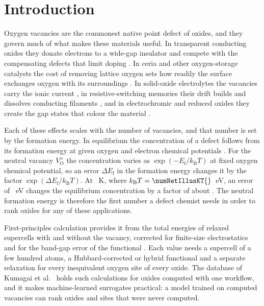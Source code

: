\section{Introduction}
\label{sec:introduction}

Oxygen vacancies are the commonest native point defect of oxides, and they govern much of what makes these materials useful. In transparent conducting oxides they donate electrons to a wide-gap insulator and compete with the compensating defects that limit doping \citep{Lany2007dopability,Zhang2001intrinsic,Ellmer2012past}. In ceria and other oxygen-storage catalysts the cost of removing lattice oxygen sets how readily the surface exchanges oxygen with its surroundings \citep{Esch2005electron,Paier2013oxygen}. In solid-oxide electrolytes the vacancies carry the ionic current \citep{Goodenough2003oxideion,Kilner2014materials}, in resistive-switching memories their drift builds and dissolves conducting filaments \citep{Waser2007nanoionicsbased,Yang2008memristive}, and in electrochromic and reduced oxides they create the gap states that colour the material \citep{Granqvist2000electrochromic,Chen2011increasing}.

Each of these effects scales with the number of vacancies, and that number is set by the formation energy. In equilibrium the concentration of a defect follows from its formation energy at given oxygen and electron chemical potentials \citep{Zhang1991chemical,VandeWalle2004firstprinciples,Freysoldt2014firstprinciples}. For the neutral vacancy $V_\mathrm{O}^{\times}$ the concentration varies as $\exp(-E_\mathrm{f}/k_\mathrm{B}T)$ at fixed oxygen chemical potential, so an error $\Delta E_\mathrm{f}$ in the formation energy changes it by the factor $\exp(\Delta E_\mathrm{f}/k_\mathrm{B}T)$. At \numNetIllusTemperature{}~K, where $k_\mathrm{B}T = \numNetIllusKT{}$~eV, an error of \numNetIllusDeltaE{}~eV changes the equilibrium concentration by a factor of about \numNetIllusFactor{}. The neutral formation energy is therefore the first number a defect chemist needs in order to rank oxides for any of these applications.

First-principles calculation provides it from the total energies of relaxed supercells with and without the vacancy, corrected for finite-size electrostatics and for the band-gap error of the functional \citep{Freysoldt2014firstprinciples,Lany2008assessment}. Each value needs a supercell of a few hundred atoms, a Hubbard-corrected or hybrid functional and a separate relaxation for every inequivalent oxygen site of every oxide. The database of Kumagai et al.\ \citep{Kumagai2021insights} holds such calculations for \numNetReleaseOxides{} oxides computed with one workflow, and it makes machine-learned surrogates practical: a model trained on computed vacancies can rank oxides and sites that were never computed.


